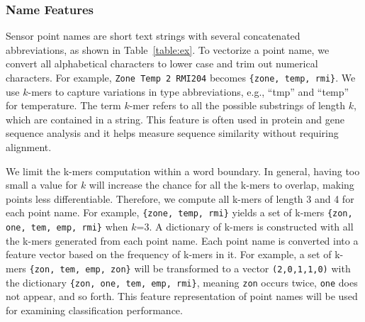 
\subsubsection{Name Features}
Sensor point names are short text strings with several concatenated abbreviations, as shown in Table~\ref{table:ex}. 
To vectorize a point name, we convert all alphabetical characters to lower case and trim out numerical characters. 
For example, \texttt{Zone Temp 2 RMI204} becomes \texttt{\{zone, temp, rmi\}}. 
We use $k$-mers \cite{leslie2004mismatch} to capture variations in type abbreviations, e.g., ``tmp'' and ``temp'' for temperature.
The term $k$-mer refers to all the possible substrings of length $k$, which are contained in a string. This feature is often used in protein and gene sequence analysis and 
it helps measure sequence similarity without requiring alignment. 

We limit the k-mers computation within a word boundary.
In general, having too small a value for $k$ will increase the chance for all the k-mers to overlap, making points less differentiable.
Therefore, we compute all k-mers of length 3 and 4 for each point name.
For example, \texttt{\{zone, temp, rmi\}} yields a set of k-mers \texttt{\{zon, one, tem, emp, rmi\}} when $k$=3.
A dictionary of k-mers is constructed with all the k-mers generated from each point name. 
Each point name is converted into a feature vector based on the frequency of k-mers in it. 
For example, a set of k-mers \texttt{\{zon, tem, emp, zon\}} will be transformed to a vector
\texttt{(2,0,1,1,0)} with the dictionary \texttt{\{zon, one, tem, emp, rmi\}}, meaning \texttt{zon} occurs twice, \texttt{one} does 
not appear, and so forth. 
This feature representation of point names will be used for examining classification performance.


